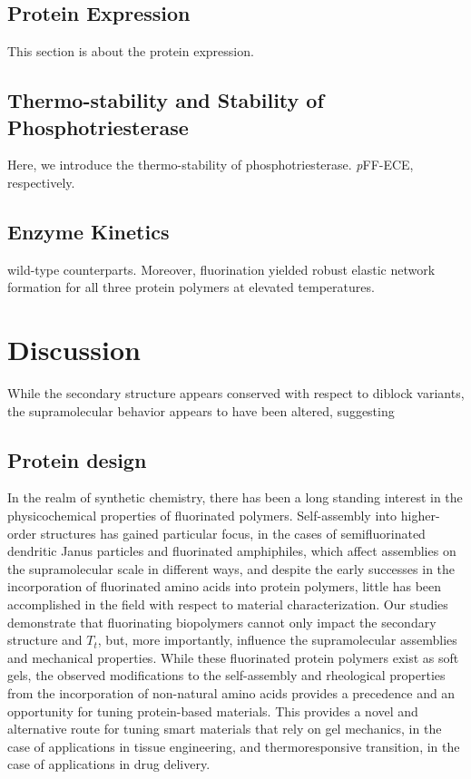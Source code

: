 \begin{refsection}
\subsection{Protein Expression}

This section is about the protein expression.

\subsection{Thermo-stability and Stability of Phosphotriesterase}
\label{sec:thermo}

Here, we introduce the thermo-stability of phosphotriesterase.
\emph{p}FF-ECE, respectively.

\subsection{Enzyme Kinetics}

wild-type counterparts. Moreover, fluorination yielded robust elastic network
formation for all three protein polymers at elevated temperatures. 

\section{Discussion}

While the secondary structure appears conserved with respect to diblock
variants, the supramolecular behavior appears to have been altered, suggesting

\subsection{Protein design}

In the realm of synthetic chemistry, there has been a long standing interest in
the physicochemical properties of fluorinated polymers. Self-assembly into
higher-order structures has gained particular focus, in the cases of
semifluorinated dendritic Janus particles and fluorinated amphiphiles, which
affect assemblies on the supramolecular scale in different ways, and
despite the early successes in the incorporation of fluorinated amino acids into
protein polymers, little has been accomplished in the field with respect to
material characterization. Our studies demonstrate that fluorinating biopolymers
cannot only impact the secondary structure and ${T_t}$, but, more importantly,
influence the supramolecular assemblies and mechanical properties. While these
fluorinated protein polymers exist as soft gels, the observed modifications to
the self-assembly and rheological properties from the incorporation of
non-natural amino acids provides a precedence and an opportunity for tuning
protein-based materials. This provides a novel and alternative route for tuning
smart materials that rely on gel mechanics, in the case of applications in
tissue engineering, and thermoresponsive transition, in the case of applications
in drug delivery. 


\end{refsection}
